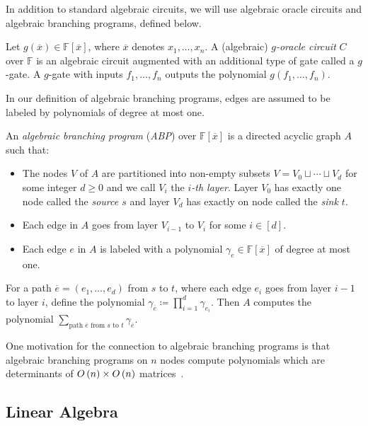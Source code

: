 \documentclass[10pt,a4paper]{amsart}
\newcommand*\F{\mathbb{F}}
\newcommand*\defeq{\coloneqq}
\newcommand*\bigO[1]{%
    O\kern-0.0pt\left(#1\right)
}
\begin{document}
In addition to standard algebraic circuits, we will use algebraic oracle circuits and algebraic branching programs, defined below.
\begin{defn}\label{defn:oracle_ckt}
Let $g(\overline{x}) \in \F[\overline{x}]$, where $\overline{x}$ denotes $x_1, \ldots, x_n$.  
A (algebraic) \emph{$g$-oracle circuit} $C$ over $\F$ is an algebraic circuit augmented with an additional type of gate called a $g$-gate.  
A $g$-gate with inputs $f_1,\dots,f_n$ outputs the polynomial $g(f_1,\dots,f_n)$.
\end{defn}

In our definition of algebraic branching programs, edges are assumed to be labeled by polynomials of degree at most one.
\begin{defn}\label{defn:ABP}
    An \emph{algebraic branching program} (\emph{ABP}) over $\F[\overline{x}]$ is a directed acyclic graph $A$ such that:
    \begin{itemize}
        \item The nodes $V$ of $A$ are partitioned into non-empty subsets $V = V_0 \sqcup \cdots \sqcup V_d$ for some integer $d\geq 0$ and we call $V_i$ the \emph{$i$-th layer}.
              Layer $V_0$ has exactly one node called the \emph{source $s$} and layer $V_d$ has exactly on node called the \emph{sink $t$}.
        \item Each edge in $A$ goes from layer $V_{i-1}$ to $V_i$ for some $i\in [d]$.
        \item Each edge $e$ in $A$ is labeled with a polynomial $\gamma_e \in \F[\overline{x}]$ of degree at most one.
    \end{itemize}
    For a path $\overline{e} = (e_1, \ldots, e_d)$ from $s$ to $t$, where each edge $e_i$ goes from layer $i - 1$ to layer $i$, define the polynomial $\gamma_{\overline{e}} \defeq \prod_{i = 1}^d \gamma_{e_i}$.
    Then $A$ computes the polynomial $\sum_{\text{path } \overline{e} \text{ from } s \text{ to } t} \gamma_{\overline{e}}$.
\end{defn}
One motivation for the connection to algebraic branching programs is that algebraic branching programs on $n$ nodes compute polynomials which are determinants of $\bigO{n} \times \bigO{n}$ matrices~\cite[Theorem 1]{Val79}.

\subsection{Linear Algebra}\label{sec:linalg}
\end{document}

